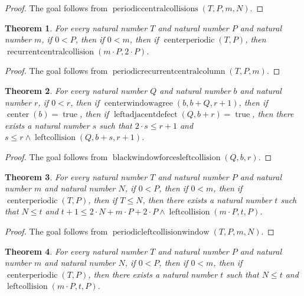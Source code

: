 \documentclass[11pt]{article}
\newtheorem{theorem}{Theorem}[section]
\theoremstyle{definition}
\begin{document}
\begin{proof}
The goal follows from \(\operatorname{periodiccentralcollisions}(T, P, m, N)\).
\end{proof}
\begin{theorem}
\label{ll:observations:periodic-recurrent-central-column}
For every natural number \(T\) and natural number \(P\) and natural number \(m\), if \(0 < P\), then if \(0 < m\), then if \(\operatorname{centerperiodic}(T, P)\), then \(\operatorname{recurrentcentralcollision}(m \cdot P, 2 \cdot P)\).
\end{theorem}
\begin{proof}
The goal follows from \(\operatorname{periodicrecurrentcentralcolumn}(T, P, m)\).
\end{proof}
\begin{theorem}
\label{ll:observations:black-window-forces-left-collision}
For every natural number \(Q\) and natural number \(b\) and natural number \(r\), if \(0 < r\), then if \(\operatorname{centerwindowagree}(b, b + Q, r + 1)\), then if \(\operatorname{center}(b) = \operatorname{true}\), then if \(\operatorname{leftadjacentdefect}(Q, b + r) = \operatorname{true}\), then there exists a natural number \(s\) such that \(2 \cdot s \le r + 1\) and \(s \le r \land \operatorname{leftcollision}(Q, b + s, r + 1)\).
\end{theorem}
\begin{proof}
The goal follows from \(\operatorname{blackwindowforcesleftcollision}(Q, b, r)\).
\end{proof}
\begin{theorem}
\label{ll:observations:periodic-left-collision-window}
For every natural number \(T\) and natural number \(P\) and natural number \(m\) and natural number \(N\), if \(0 < P\), then if \(0 < m\), then if \(\operatorname{centerperiodic}(T, P)\), then if \(T \le N\), then there exists a natural number \(t\) such that \(N \le t\) and \(t + 1 \le 2 \cdot N + m \cdot P + 2 \cdot P \land \operatorname{leftcollision}(m \cdot P, t, P)\).
\end{theorem}
\begin{proof}
The goal follows from \(\operatorname{periodicleftcollisionwindow}(T, P, m, N)\).
\end{proof}
\begin{theorem}
\label{ll:observations:periodic-left-collisions}
For every natural number \(T\) and natural number \(P\) and natural number \(m\) and natural number \(N\), if \(0 < P\), then if \(0 < m\), then if \(\operatorname{centerperiodic}(T, P)\), then there exists a natural number \(t\) such that \(N \le t\) and \(\operatorname{leftcollision}(m \cdot P, t, P)\).
\end{theorem}
\end{document}
